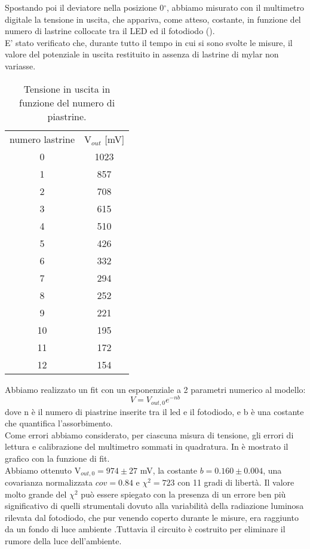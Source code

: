  Spostando poi il deviatore nella posizione 0$^\circ$, abbiamo misurato con il multimetro digitale la tensione in uscita, che appariva, come atteso, costante, in funzione del numero di lastrine collocate tra il LED ed il fotodiodo ().\\ E' stato verificato che, durante tutto il tempo in cui si sono svolte le misure, il valore del potenziale in uscita restituito in assenza di lastrine di mylar non variasse. 
\begin{table}[h]
	\centering
	\begin{tabular}{cc}		
		{numero lastrine} & {V$_{out}$ [mV]}\\
                      0 & 1023\\
                      1 & 857\\
                      2 & 708\\
                      3 & 615\\
                      4 & 510\\
                      5 & 426\\
                      6 & 332\\
                      7 & 294\\
                      8 & 252\\
                      9 & 221\\
                     10 & 195\\
                     11 & 172\\
                     12 & 154\\
	           \midrule
	
 	\end{tabular}
	\caption{Tensione in uscita in funzione del numero di piastrine. }
	\label{t:Fotodiodo}
\end{table}
Abbiamo realizzato un fit con un esponenziale a 2 parametri numerico al modello:
\begin{equation}
V=V_{out,0}e^{-nb}
\end{equation}
dove n è il numero di piastrine inserite tra il led e il fotodiodo, e b è una costante che quantifica l'assorbimento.\\
 Come errori abbiamo considerato, per ciascuna misura di tensione, gli errori di lettura e calibrazione del multimetro sommati in quadratura. In  è mostrato il grafico con la funzione di fit.\\
Abbiamo ottenuto V$_{out,0} = 974 \pm 27$ mV, la costante $b = 0.160 \pm 0.004$, una covarianza normalizzata $cov = 0.84$ e $\chi^2 = 723$ con 11 gradi di libertà. Il valore molto grande del $\chi^2$ può essere spiegato con la presenza di un errore ben più significativo di quelli strumentali dovuto alla variabilità della radiazione luminosa rilevata dal fotodiodo, che pur venendo coperto durante le misure, era raggiunto da un fondo di luce ambiente .Tuttavia il circuito è costruito per eliminare il rumore della luce dell'ambiente.\\
